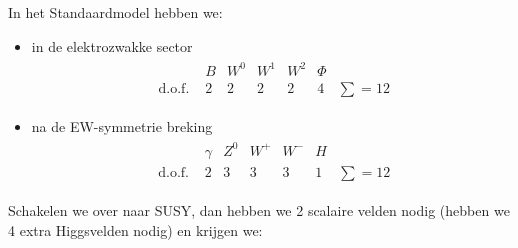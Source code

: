 \documentclass[../main.tex]{subfiles}
\begin{document}
In het Standaardmodel hebben we:
\begin{itemize}
    \item in de elektrozwakke sector
        \begin{equation}
            \begin{aligned}
                \label{eq:susy_deeltjes_3}
                \begin{array}{lcccccc} 
                                        & B & W^{0} & W^{1} & W^{2} & \Phi  & \\
                    \text { d.o.f. }    & 2 & 2     & 2     & 2     & 4     & \sum=12
                \end{array}
            \end{aligned}
        \end{equation}
    \item na de EW-symmetrie breking
        \begin{equation}
            \begin{aligned}
                \label{eq:susy_deeltjes_4}
                \begin{array}{lcccccc} 
                                        & \gamma & Z^{0} & W^{+} & W^{-} & H  & \\
                    \text { d.o.f. }    & 2 & 3     & 3     & 3     & 1     & \sum=12
                \end{array}
            \end{aligned}
        \end{equation}
\end{itemize}
Schakelen we over naar SUSY, dan hebben we 2 scalaire velden nodig (hebben we 4 extra Higgsvelden nodig) en krijgen we:
\end{document}
